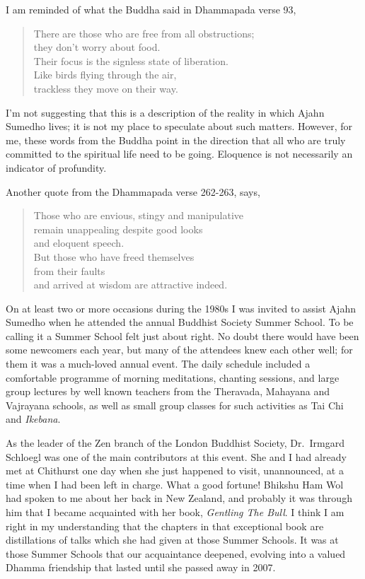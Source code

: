 I am reminded of what the Buddha said in Dhammapada verse 93,

\clearpage

\begin{quote}
  There are those who are free from all obstructions;\\
  they don't worry about food.\\
  Their focus is the signless state of liberation.\\
  Like birds flying through the air,\\
  trackless they move on their way.
\end{quote}

I'm not suggesting that this is a description of the reality in which
Ajahn Sumedho lives; it is not my place to speculate about such matters.
However, for me, these words from the Buddha point in the direction that
all who are truly committed to the spiritual life need to be going.
Eloquence is not necessarily an indicator of profundity.

Another quote from the Dhammapada verse 262-263, says,

\begin{quote}
  Those who are envious, stingy and manipulative\\
  remain unappealing despite good looks\\
  and eloquent speech.\\
  But those who have freed themselves\\
  from their faults\\
  and arrived at wisdom are attractive indeed.
\end{quote}

On at least two or more occasions during the 1980s I was invited to
assist Ajahn Sumedho when he attended the annual Buddhist Society Summer
School\cite{summer}.
To be calling it a Summer School felt just about right.
No doubt there would have been some newcomers each year, but many of the
attendees knew each other well; for them it was a much-loved annual
event. The daily schedule included a comfortable programme of morning
meditations, chanting sessions, and large group lectures by well known
teachers from the Theravada, Mahayana and Vajrayana schools, as well as
small group classes for such activities as Tai Chi and \emph{Ikebana}\cite{ikebana}.

As the leader of the Zen branch of the London Buddhist Society, Dr.~Irmgard Schloegl\cite{irmgard}
was one of the main contributors at this event. She
and I had already met at Chithurst one day when she just happened to
visit, unannounced, at a time when I had been left in charge. What a
good fortune! Bhikshu Ham Wol had spoken to me about her back in New
Zealand, and probably it was through him that I became acquainted with
her book, \emph{Gentling The Bull}.
I think I am right in my understanding that the
chapters in that exceptional book are distillations of talks which she
had given at those Summer Schools. It was at those Summer Schools that
our acquaintance deepened, evolving into a valued Dhamma friendship that
lasted until she passed away in 2007.

